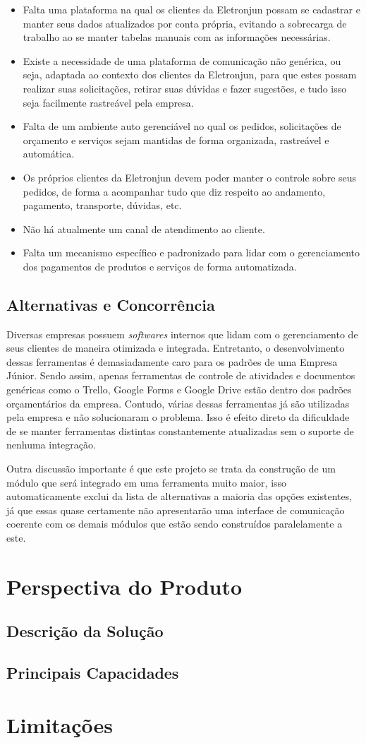       \begin{itemize}
        \item Falta uma plataforma na qual os clientes da Eletronjun possam se cadastrar e manter seus dados atualizados por conta própria, evitando a sobrecarga de trabalho ao se manter tabelas manuais com as informações necessárias.
        \item Existe a necessidade de uma plataforma de comunicação não genérica, ou seja, adaptada ao contexto dos clientes da Eletronjun, para que estes possam realizar suas solicitações, retirar suas dúvidas e fazer sugestões, e tudo isso seja facilmente rastreável pela empresa.
        \item Falta de um ambiente auto gerenciável no qual os pedidos, solicitações de orçamento e serviços sejam mantidas de forma organizada, rastreável e automática. 
        \item Os próprios clientes da Eletronjun devem poder manter o controle sobre seus pedidos, de forma a acompanhar tudo que diz respeito ao andamento, pagamento, transporte, dúvidas, etc.
        \item Não há atualmente um canal de atendimento ao cliente.
        \item Falta um mecanismo específico e padronizado para lidar com o gerenciamento dos pagamentos de produtos e serviços de forma automatizada.
      \end{itemize}

    \subsection{Alternativas e Concorrência}
Diversas empresas possuem \textit{softwares} internos que lidam com o gerenciamento de seus clientes de maneira otimizada e integrada. Entretanto, o desenvolvimento dessas ferramentas é demasiadamente caro para os padrões de uma Empresa Júnior. Sendo assim, apenas ferramentas de controle de atividades e documentos genéricas como o Trello, Google Forms e Google Drive estão dentro dos padrões orçamentários da empresa. Contudo, várias dessas ferramentas já são utilizadas pela empresa e não solucionaram o problema. Isso é efeito direto da dificuldade de se manter ferramentas distintas constantemente atualizadas sem o suporte de nenhuma integração.

Outra discussão importante é que este projeto se trata da construção de um módulo que será integrado em uma ferramenta muito maior, isso automaticamente exclui da lista de alternativas a maioria das opções existentes, já que essas quase certamente não apresentarão uma interface de comunicação coerente com os demais módulos que estão sendo construídos paralelamente a este.

  \section{Perspectiva do Produto}

    \subsection{Descrição da Solução}
    \subsection{Principais Capacidades}
  \section{Limitações} 
